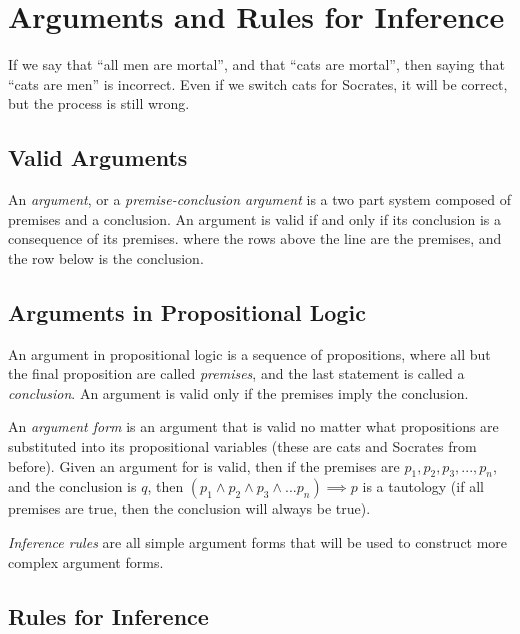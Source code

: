 \section{Arguments and Rules for Inference}\label{sec:methods_for_proof}

If we say that ``all men are mortal'', and that ``cats are mortal'', then saying that ``cats are men'' is incorrect.
Even if we switch cats for Socrates, it will be correct, but the process is still wrong.

\subsection{Valid Arguments}\label{sub:valid_arguments}

An \emph{argument}, or a \emph{premise-conclusion argument} is a two part system composed of premises and a conclusion.
An argument is valid if and only if its conclusion is a consequence of its premises.
where the rows above the line are the premises, and the row below is the conclusion.

\subsection{Arguments in Propositional Logic}\label{sub:arguments_in_propositional_logic}

An argument in propositional logic is a sequence of propositions, where all but the final proposition are called \emph{premises}, and the last statement is called a \emph{conclusion}.
An argument is valid only if the premises imply the conclusion.

An \emph{argument form} is an argument that is valid no matter what propositions are substituted into its propositional variables (these are cats and Socrates from before).
Given an argument for is valid, then if the premises are \(p_1, p_2, p_3, ..., p_n\), and the conclusion is \(q\), then \(\left( p_1 \land p_2 \land p_3 \land ... p_n \right) \implies p\) is a tautology (if all premises are true, then the conclusion will always be true).

\emph{Inference rules} are all simple argument forms that will be used to construct more complex argument forms.

\subsection{Rules for Inference}\label{sub:rules_for_inference}

